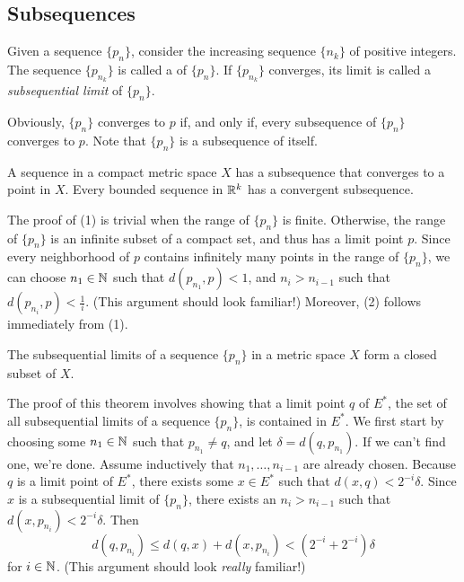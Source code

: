\documentclass{article}
\begin{document}
\subsection{Subsequences}
\begin{definition}
    Given a sequence $\{p_{n}\}$, consider the increasing sequence $\{n_{k}\}$ of positive integers. The sequence $\{p_{n_{k}}\}$ is called a  of $\{p_{n}\}$. If $\{p_{n_{k}}\}$ converges, its limit is called a \textit{subsequential limit} of $\{p_{n}\}$.
\end{definition}
\begin{remark}
    Obviously, $\{p_{n}\}$ converges to $p$ if, and only if, every subsequence of $\{p_{n}\}$ converges to $p$. Note that $\{p_{n}\}$ is a subsequence of itself.
\end{remark}
\begin{theorem}
    \listhack 
    \begin{enumerate}
        \ii A sequence in a compact metric space $X$ has a subsequence that converges to a point in $X$.
        \ii Every bounded sequence in $\mathbb R^{k}$ has a convergent subsequence.
    \end{enumerate}
\end{theorem}
\begin{remark}
    The proof of (1) is trivial when the range of $\{p_{n}\}$ is finite. Otherwise, the range of $\{p_{n}\}$ is an infinite subset of a compact set, and thus has a limit point $p$. Since every neighborhood of $p$ contains infinitely many points in the range of $\{p_{n}\}$, we can choose $n_{1}\in\mathbb N$ such that $d(p_{n_{1}},p)<1$, and $n_{i}>n_{i-1}$ such that $d(p_{n_{i}},p)<\frac{1}{i}$. (This argument should look familiar!) Moreover, (2) follows immediately from (1).
\end{remark}
\begin{theorem}
    The subsequential limits of a sequence $\{p_{n}\}$ in a metric space $X$ form a closed subset of $X$.
\end{theorem}
\begin{remark}
    The proof of this theorem involves showing that a limit point $q$ of $E^{*}$, the set of all subsequential limits of a sequence $\{p_{n}\}$, is contained in $E^{*}$. We first start by choosing some $n_{1}\in\mathbb N$ such that $p_{n_{1}}\neq q$, and let $\delta=d(q,p_{n_{1}})$. If we can't find one, we're done. Assume inductively that $n_{1},\dotsc,n_{i-1}$ are already chosen. Because $q$ is a limit point of $E^{*}$, there exists some $x\in E^{*}$ such that $d(x,q)<2^{-i}\delta$. Since $x$ is a subsequential limit of $\{p_{n}\}$, there exists an $n_{i}>n_{i-1}$ such that $d(x,p_{n_{i}})< 2^{-i}\delta$. Then \[d(q,p_{n_{i}})\leq d(q,x)+d(x,p_{n_{i}})<(2^{-i}+2^{-i})\delta\]for $i\in\mathbb N$. (This argument should look \textit{really} familiar!)
\end{remark}
\end{document}
